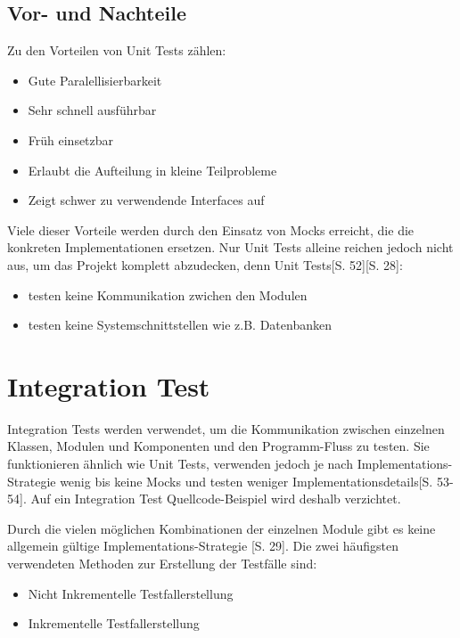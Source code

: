 \documentclass[a4paper,bibtotoc,oneside]{scrbook}
\begin{document}

\newpage
\section{Vor- und Nachteile}

Zu den Vorteilen von Unit Tests zählen:

\begin{itemize}
  \item Gute Paralellisierbarkeit
  \item Sehr schnell ausführbar
  \item Früh einsetzbar
  \item Erlaubt die Aufteilung in kleine Teilprobleme
  \item Zeigt schwer zu verwendende Interfaces auf
\end{itemize}

Viele dieser Vorteile werden durch den Einsatz von Mocks erreicht, die die konkreten Implementationen ersetzen. Nur Unit Tests alleine reichen jedoch nicht aus, um das Projekt komplett abzudecken, denn Unit Tests\cite{test_large_systems}[S. 52]\cite{betrieb}[S. 28]:

\begin{itemize}
  \item testen keine Kommunikation zwichen den Modulen
  \item testen keine Systemschnittstellen wie z.B. Datenbanken
\end{itemize}

\chapter{Integration Test}
Integration Tests werden verwendet, um die Kommunikation zwischen einzelnen Klassen, Modulen und Komponenten und den Programm-Fluss zu testen. Sie funktionieren ähnlich wie Unit Tests, verwenden jedoch je nach Implementations-Strategie wenig bis keine Mocks und testen weniger Implementationsdetails\cite{test_large_systems}[S. 53-54]. Auf ein Integration Test Quellcode-Beispiel wird deshalb verzichtet. 

Durch die vielen möglichen Kombinationen der einzelnen Module gibt es keine allgemein gültige Implementations-Strategie \cite{betrieb}[S. 29]. Die zwei häufigsten verwendeten Methoden zur Erstellung der Testfälle sind:

\begin{itemize}
	\item Nicht Inkrementelle Testfallerstellung
	\item Inkrementelle Testfallerstellung
\end{itemize}
\end{document}
